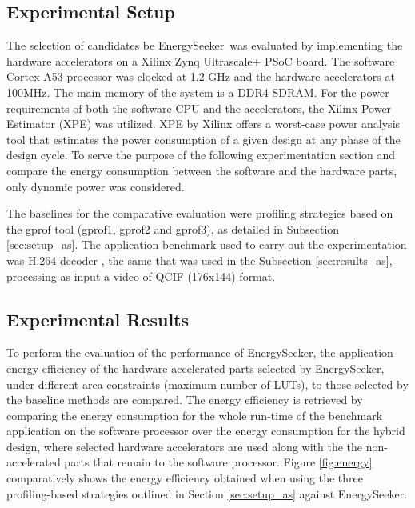 \documentclass[]{usiinfthesis}
\newcommand{\eseeker}{{EnergySeeker}}
\begin{document}

\subsection{Experimental Setup}
\label{sec:results_set}

The selection of candidates be \eseeker\ was evaluated by implementing the 
hardware accelerators on a Xilinx Zynq Ultrascale+ PSoC board. The software 
Cortex A53 processor was clocked at 1.2 GHz and the hardware accelerators at 100MHz.
The main memory of the system is a DDR4 SDRAM.
For the power requirements of both the software CPU and the accelerators, the Xilinx
Power Estimator (XPE) \cite{XpeSep19} was utilized. XPE by Xilinx offers a worst-case
power analysis tool that estimates the power consumption of a given design at any 
phase of the design cycle. To serve the purpose of the following experimentation section
and compare the energy consumption between the software and the hardware parts, only dynamic 
power was considered. \par 

The baselines for the comparative evaluation were profiling strategies based on the 
gprof tool (gprof1, gprof2 and gprof3), as detailed in Subsection \ref{sec:setup_as}. 
The application benchmark used to carry out the experimentation was H.264 decoder 
\cite{LiuFeb16}, the same that was used in the Subsection \ref{sec:results_as}, processing 
as input a video of QCIF (176x144) format.


\subsection{Experimental Results}
\label{sec:results_es}


To perform the evaluation of the performance of \eseeker, the application energy efficiency of the 
hardware-accelerated parts selected by \eseeker, under different area constraints (maximum number of 
LUTs), to those selected by the baseline methods are compared.
The energy efficiency is retrieved by comparing the energy consumption for the whole run-time of the 
benchmark application on the software processor over the energy consumption for the hybrid design, where 
selected hardware accelerators are used along with the the non-accelerated parts that remain to the  
software processor. Figure \ref{fig:energy} comparatively shows the energy efficiency obtained when using 
the three profiling-based strategies outlined in Section \ref{sec:setup_as} against \eseeker.\par
\end{document}
